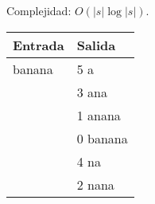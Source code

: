 \documentclass[12pt, letterpaper, twoside]{article}
\begin{document}
Complejidad: $O(|s|\log |s|)$.

 \medskip

\begin{tabular}{|p{7cm}|p{7cm}|}
\hline
\textbf{Entrada} & \textbf{Salida}\\ \hline
banana & 5 a\\
       & 3 ana\\
       & 1 anana\\
       & 0 banana\\
       & 4 na\\
       & 2 nana\\ \hline
\end{tabular}

\newpage
\end{document}
